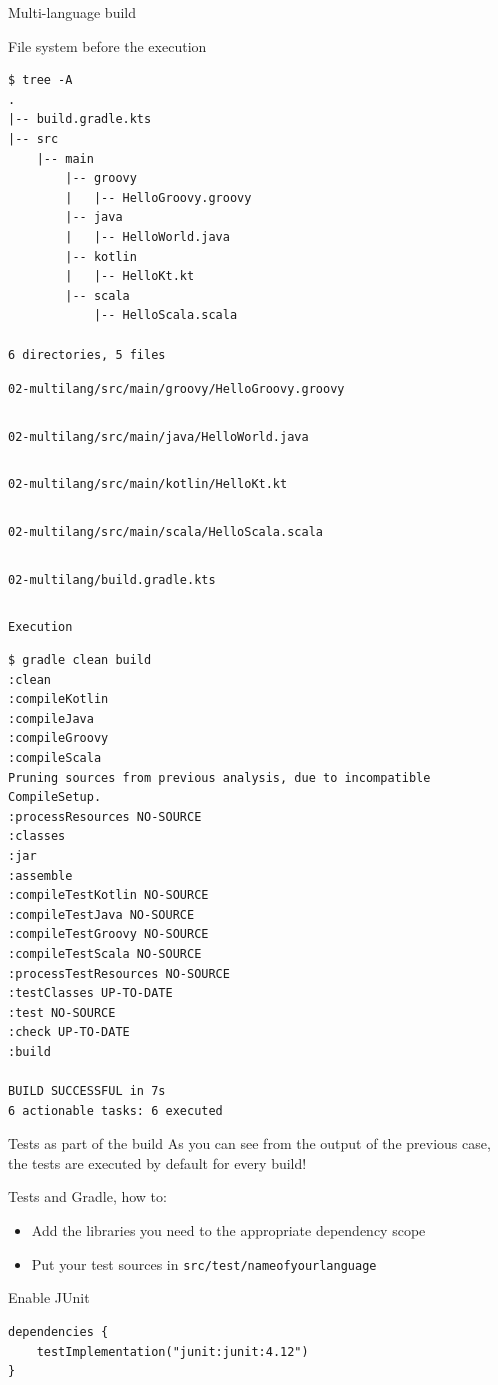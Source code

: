 \documentclass[presentation]{beamer}
\newcommand{\codefile}[3]{
	\begin{block}{\texttt{#1}}
		\inputminted[fontsize=#2,linenos=true,breaklines=true]{#3}{workspace/#1}
	\end{block}
}
\newcommand{\java}[2]{\codefile{#1}{#2}{java}}
\newcommand{\groovy}[2]{\codefile{#1}{#2}{groovy}}
\newcommand{\kotlin}[2]{\codefile{#1}{#2}{kotlin}}
\newcommand{\scala}[2]{\codefile{#1}{#2}{scala}}
\begin{document}
\begin{frame}{Multi-language build}
	\begin{block}{File system before the execution}
		\begin{verbatim}
$ tree -A
.
|-- build.gradle.kts
|-- src
    |-- main
        |-- groovy
        |   |-- HelloGroovy.groovy
        |-- java
        |   |-- HelloWorld.java
        |-- kotlin
        |   |-- HelloKt.kt
        |-- scala
            |-- HelloScala.scala

6 directories, 5 files
		\end{verbatim}
	\end{block}
	\groovy{02-multilang/src/main/groovy/HelloGroovy.groovy}{\normalsize}
	\java{02-multilang/src/main/java/HelloWorld.java}{\normalsize}
	\kotlin{02-multilang/src/main/kotlin/HelloKt.kt}{\normalsize}
	\scala{02-multilang/src/main/scala/HelloScala.scala}{\normalsize}
	\groovy{02-multilang/build.gradle.kts}{\tiny}
	\begin{block}{\texttt{Execution}}
		\begin{verbatim}
$ gradle clean build
:clean
:compileKotlin
:compileJava
:compileGroovy
:compileScala
Pruning sources from previous analysis, due to incompatible CompileSetup.
:processResources NO-SOURCE
:classes
:jar
:assemble
:compileTestKotlin NO-SOURCE
:compileTestJava NO-SOURCE
:compileTestGroovy NO-SOURCE
:compileTestScala NO-SOURCE
:processTestResources NO-SOURCE
:testClasses UP-TO-DATE
:test NO-SOURCE
:check UP-TO-DATE
:build

BUILD SUCCESSFUL in 7s
6 actionable tasks: 6 executed
		\end{verbatim}
	\end{block}
\end{frame}

\begin{frame}[fragile]{Tests as part of the build}
	As you can see from the output of the previous case, the tests are executed by default for every build!
	\begin{block}{Tests and Gradle, how to:}
		\begin{itemize}
			\item Add the libraries you need to the appropriate dependency scope
			\item Put your test sources in \texttt{src/test/nameofyourlanguage}
		\end{itemize}
	\end{block}
	\begin{block}{Enable JUnit}
		\begin{verbatim}
dependencies {
    testImplementation("junit:junit:4.12")
}
		\end{verbatim}
	\end{block}
\end{frame}
\end{document}
